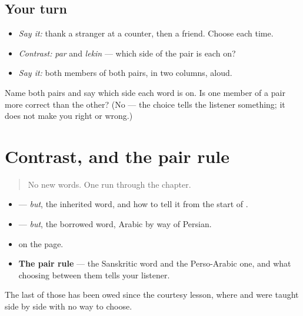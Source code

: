 \subsection*{Your turn}
\begin{itemize}
\raggedright
  \item \emph{Say it:} thank a stranger at a counter, then a friend. Choose each time.
  \item \emph{Contrast:} \emph{par} and \emph{lekin} — which side of the pair is each on?
  \item \emph{Say it:} both members of both pairs, in two columns, aloud.
\end{itemize}

\begin{tcolorbox}[breakable,colback=teal!4,colframe=teal!35!black,title={Before you move on}]
Name both pairs and say which side each word is on. Is one member of a pair more correct than the other? (No — the choice tells the listener something; it does not make you right or wrong.)
\end{tcolorbox}
\section[Practice]{Contrast, and the pair rule}

\label{lesson:PA-C39-but-checkpoint}



\begin{quote}
No new words. One run through the chapter.
\end{quote}

\begin{grammarlens}[title={What you've built}]
\begin{itemize}
\raggedright
  \item \textbf{} — \emph{but}, the inherited word, and how to tell it from the start of \textbf{}.
  \item \textbf{} — \emph{but}, the borrowed word, Arabic by way of Persian.
  \item \textbf{} on the page.
  \item \textbf{The pair rule} — the Sanskritic word and the Perso-Arabic one, and what choosing between them tells your listener.
\end{itemize}

The last of those has been owed since the courtesy lesson, where \textbf{} and \textbf{} were taught side by side with no way to choose.
\end{grammarlens}

